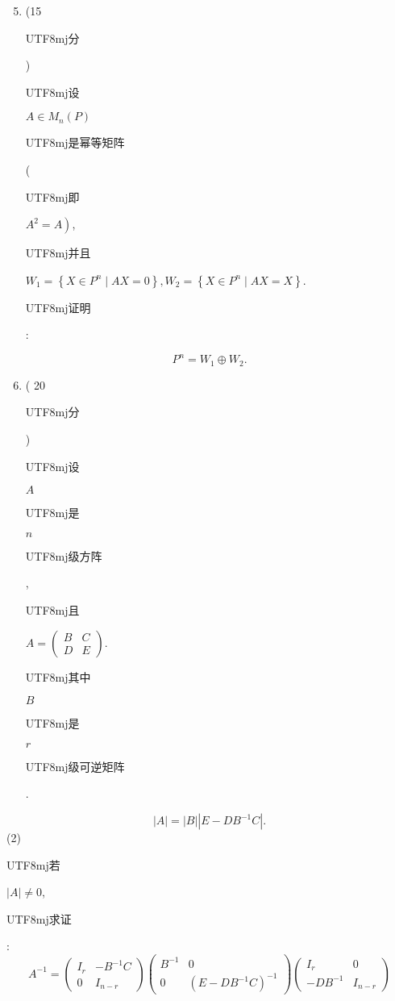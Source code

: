 \documentclass[10pt]{article}
\begin{document}
\begin{enumerate}
  \setcounter{enumi}{4}
  \item (15 \begin{CJK}{UTF8}{mj}分\end{CJK}) \begin{CJK}{UTF8}{mj}设\end{CJK} $A \in M_{n}(P)$ \begin{CJK}{UTF8}{mj}是幂等矩阵\end{CJK} (\begin{CJK}{UTF8}{mj}即\end{CJK} $\left.A^{2}=A\right)$, \begin{CJK}{UTF8}{mj}并且\end{CJK} $W_{1}=\left\{X \in P^{n} \mid A X=0\right\}, W_{2}=\left\{X \in P^{n} \mid A X=X\right\}$. \begin{CJK}{UTF8}{mj}证明\end{CJK}:
\end{enumerate}
$$
P^{n}=W_{1} \oplus W_{2} .
$$

\begin{enumerate}
  \setcounter{enumi}{5}
  \item ( 20 \begin{CJK}{UTF8}{mj}分\end{CJK}) \begin{CJK}{UTF8}{mj}设\end{CJK} $A$ \begin{CJK}{UTF8}{mj}是\end{CJK} $n$ \begin{CJK}{UTF8}{mj}级方阵\end{CJK}, \begin{CJK}{UTF8}{mj}且\end{CJK} $A=\left(\begin{array}{cc}B & C \\ D & E\end{array}\right)$. \begin{CJK}{UTF8}{mj}其中\end{CJK} $B$ \begin{CJK}{UTF8}{mj}是\end{CJK} $r$ \begin{CJK}{UTF8}{mj}级可逆矩阵\end{CJK}.
\end{enumerate}
$$
|A|=|B|\left|E-D B^{-1} C\right| .
$$
(2) \begin{CJK}{UTF8}{mj}若\end{CJK} $|A| \neq 0$, \begin{CJK}{UTF8}{mj}求证\end{CJK}:
$$
A^{-1}=\left(\begin{array}{cc}
I_{r} & -B^{-1} C \\
0 & I_{n-r}
\end{array}\right)\left(\begin{array}{cc}
B^{-1} & 0 \\
0 & \left(E-D B^{-1} C\right)^{-1}
\end{array}\right)\left(\begin{array}{cc}
I_{r} & 0 \\
-D B^{-1} & I_{n-r}
\end{array}\right)
$$
\end{document}
